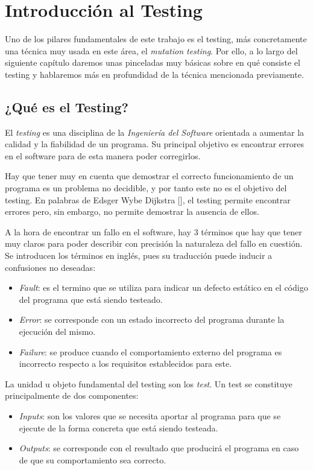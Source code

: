 \chapter{Introducción al Testing}
Uno de los pilares fundamentales de este trabajo es el testing, más concretamente una técnica muy usada en este área, el \textit{mutation testing}. Por ello, a lo largo del siguiente capítulo daremos 
unas pinceladas muy básicas sobre en qué consiste el testing y hablaremos más en profundidad  de la técnica mencionada previamente.

\section{¿Qué es el Testing?}

El \emph{testing} es una disciplina de la \textit{Ingeniería del Software} orientada a aumentar la calidad y la fiabilidad de un programa. Su principal objetivo es encontrar errores en el software para de esta manera poder corregirlos.

Hay que tener muy en cuenta que demostrar el correcto funcionamiento de un programa es un problema no decidible, y por tanto este no es el objetivo del testing. En palabras de Edsger Wybe Dijkstra [\cite{dijkstra1972chapter}], el testing permite encontrar errores pero, sin embargo, no permite demostrar la ausencia de ellos.

A la hora de encontrar un fallo en el software, hay 3 términos que hay que tener muy claros para poder describir con precisión la naturaleza del fallo en cuestión. Se introducen los términos en inglés, pues su traducción puede inducir a confusiones no deseadas:
\begin{itemize}
\item \emph{Fault}: es el termino que se utiliza para indicar un defecto estático en el código del programa que está siendo testeado.
\item \emph{Error}: se corresponde con un estado incorrecto del programa durante la ejecución del mismo.
\item \emph{Failure}: se produce cuando el comportamiento externo del programa es incorrecto respecto a los requisitos establecidos para este.
\end{itemize}

La unidad u objeto fundamental del testing son los \emph{test}. Un test se constituye principalmente de dos componentes:
\begin{itemize}
\item \emph{Inputs}: son los valores que se necesita aportar al programa para que se ejecute de la forma concreta que está siendo testeada.
\item \emph{Outputs}: se corresponde con el resultado que producirá el programa en caso de que su comportamiento sea correcto.
\end{itemize}

